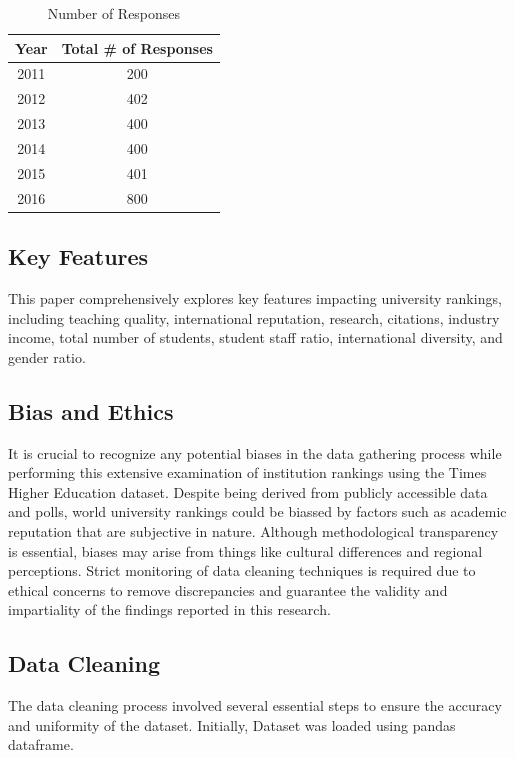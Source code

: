 \documentclass[a4paper]{article}
\begin{document}
\begin{table}[h]
    \centering
    \caption{Number of Responses}
    \begin{tabular}{|c|c|}
        \hline
        \textbf{Year} & \textbf{Total \# of Responses} \\
        \hline
        2011 & 200 \\
        \hline
        2012 & 402 \\
        \hline
        2013 & 400 \\
        \hline
        2014 & 400 \\
        \hline
        2015 & 401 \\
        \hline
        2016 & 800 \\
        \hline
    \end{tabular}
\end{table}

\subsection* {Key Features}
This paper comprehensively explores key features impacting university rankings, including teaching quality, international reputation, research, citations, industry income, total number of students, student staff ratio, international diversity, and gender ratio.

\subsection* {Bias and Ethics}
It is crucial to recognize any potential biases in the data gathering process while performing this extensive examination of institution rankings using the Times Higher Education dataset. Despite being derived from publicly accessible data and polls, world university rankings could be biassed by factors such as academic reputation that are subjective in nature. Although methodological transparency is essential, biases may arise from things like cultural differences and regional perceptions. Strict monitoring of data cleaning techniques is required due to ethical concerns to remove discrepancies and guarantee the validity and impartiality of the findings reported in this research.

\subsection* {Data Cleaning} 
The data cleaning process involved several essential steps to ensure the accuracy and uniformity of the dataset. Initially, Dataset was loaded using pandas dataframe. 
\end{document}
